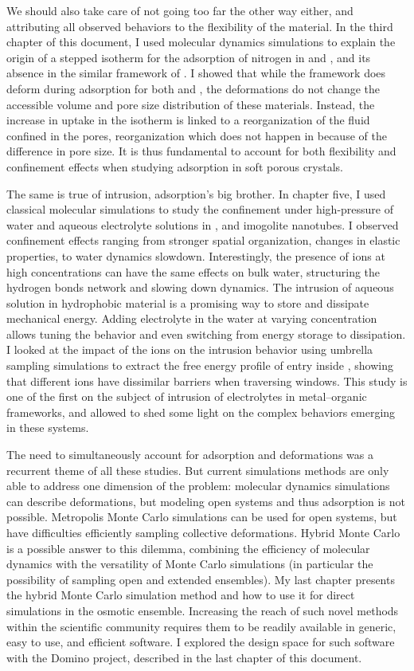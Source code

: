 We should also take care of not going too far the other way either, and
attributing all observed behaviors to the flexibility of the material. In the third
chapter of this document, I used \abinitio molecular dynamics simulations to
explain the origin of a stepped isotherm for the adsorption of nitrogen in
 and \ZIFCl, and its absence in the similar framework of \ZIFBr. I showed
that while the framework does deform during adsorption for both  and
\ZIFCl, the deformations do not change the accessible volume and pore size
distribution of these materials. Instead, the increase in uptake in the isotherm
is linked to a reorganization of the fluid confined in the pores, reorganization
which does not happen in \ZIFBr because of the difference in pore size. It is
thus fundamental to account for both flexibility and confinement effects when
studying adsorption in soft porous crystals.

The same is true of intrusion, adsorption's big brother. In chapter five, I used
classical molecular simulations to study the confinement under high-pressure of
water and aqueous electrolyte solutions in , and imogolite nanotubes. I
observed confinement effects ranging from stronger spatial organization, changes
in elastic properties, to water dynamics slowdown. Interestingly, the presence
of ions at high concentrations can have the same effects on bulk water,
structuring the hydrogen bonds network and slowing down dynamics. The intrusion
of aqueous solution in hydrophobic material is a promising way to store and
dissipate mechanical energy. Adding electrolyte in the water at varying
concentration allows tuning the behavior and even switching from energy storage
to dissipation. I looked at the impact of the ions on the intrusion behavior
using umbrella sampling simulations to extract the free energy profile of entry
inside , showing that different ions have dissimilar barriers when
traversing  windows. This study is one of the first on the subject of
intrusion of electrolytes in metal--organic frameworks, and allowed to shed some
light on the complex behaviors emerging in these systems.

The need to simultaneously account for adsorption and deformations was a
recurrent theme of all these studies. But current simulations methods are only
able to address one dimension of the problem: molecular dynamics simulations can
describe deformations, but modeling open systems and thus adsorption is not
possible. Metropolis Monte Carlo simulations can be used for open systems, but
have difficulties efficiently sampling collective deformations. Hybrid Monte
Carlo is a possible answer to this dilemma, combining the efficiency of
molecular dynamics with the versatility of Monte Carlo simulations (in
particular the possibility of sampling open and extended ensembles). My last
chapter presents the hybrid Monte Carlo simulation method and how to use it for
direct simulations in the osmotic ensemble. Increasing the reach of such novel
methods within the scientific community requires them to be readily available in
generic, easy to use, and efficient software. I explored the design space for
such software with the Domino project, described in the last chapter of this
document.

